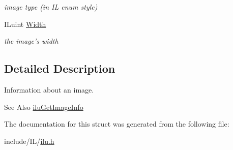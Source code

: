 \begin{DoxyCompactItemize}
\begin{DoxyCompactList}\small\item\em image type (in I\-L enum style) \end{DoxyCompactList}\item 
\hypertarget{struct_i_l_uinfo_a4146e7b2b0b4097e0e335f9b348392bf}{I\-Luint \hyperlink{struct_i_l_uinfo_a4146e7b2b0b4097e0e335f9b348392bf}{Width}}\label{struct_i_l_uinfo_a4146e7b2b0b4097e0e335f9b348392bf}

\begin{DoxyCompactList}\small\item\em the image's width \end{DoxyCompactList}\end{DoxyCompactItemize}


\subsection{Detailed Description}
Information about an image. 

\begin{DoxySeeAlso}{See Also}
\hyperlink{group__ilu__util_ga2dba9fc87a5d05e1401cd5fa08cd5728}{ilu\-Get\-Image\-Info} 
\end{DoxySeeAlso}


The documentation for this struct was generated from the following file\-:\begin{DoxyCompactItemize}
\item 
include/\-I\-L/\hyperlink{ilu_8h}{ilu.\-h}\end{DoxyCompactItemize}
